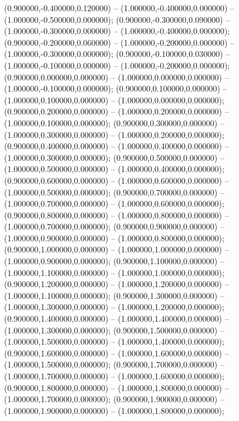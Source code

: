  (0.900000,-0.400000,0.120000) -- (1.000000,-0.400000,0.000000) -- (1.000000,-0.500000,0.000000);
 (0.900000,-0.300000,0.090000) -- (1.000000,-0.300000,0.000000) -- (1.000000,-0.400000,0.000000);
 (0.900000,-0.200000,0.060000) -- (1.000000,-0.200000,0.000000) -- (1.000000,-0.300000,0.000000);
 (0.900000,-0.100000,0.030000) -- (1.000000,-0.100000,0.000000) -- (1.000000,-0.200000,0.000000);
 (0.900000,0.000000,0.000000) -- (1.000000,0.000000,0.000000) -- (1.000000,-0.100000,0.000000);
 (0.900000,0.100000,0.000000) -- (1.000000,0.100000,0.000000) -- (1.000000,0.000000,0.000000);
 (0.900000,0.200000,0.000000) -- (1.000000,0.200000,0.000000) -- (1.000000,0.100000,0.000000);
 (0.900000,0.300000,0.000000) -- (1.000000,0.300000,0.000000) -- (1.000000,0.200000,0.000000);
 (0.900000,0.400000,0.000000) -- (1.000000,0.400000,0.000000) -- (1.000000,0.300000,0.000000);
 (0.900000,0.500000,0.000000) -- (1.000000,0.500000,0.000000) -- (1.000000,0.400000,0.000000);
 (0.900000,0.600000,0.000000) -- (1.000000,0.600000,0.000000) -- (1.000000,0.500000,0.000000);
 (0.900000,0.700000,0.000000) -- (1.000000,0.700000,0.000000) -- (1.000000,0.600000,0.000000);
 (0.900000,0.800000,0.000000) -- (1.000000,0.800000,0.000000) -- (1.000000,0.700000,0.000000);
 (0.900000,0.900000,0.000000) -- (1.000000,0.900000,0.000000) -- (1.000000,0.800000,0.000000);
 (0.900000,1.000000,0.000000) -- (1.000000,1.000000,0.000000) -- (1.000000,0.900000,0.000000);
 (0.900000,1.100000,0.000000) -- (1.000000,1.100000,0.000000) -- (1.000000,1.000000,0.000000);
 (0.900000,1.200000,0.000000) -- (1.000000,1.200000,0.000000) -- (1.000000,1.100000,0.000000);
 (0.900000,1.300000,0.000000) -- (1.000000,1.300000,0.000000) -- (1.000000,1.200000,0.000000);
 (0.900000,1.400000,0.000000) -- (1.000000,1.400000,0.000000) -- (1.000000,1.300000,0.000000);
 (0.900000,1.500000,0.000000) -- (1.000000,1.500000,0.000000) -- (1.000000,1.400000,0.000000);
 (0.900000,1.600000,0.000000) -- (1.000000,1.600000,0.000000) -- (1.000000,1.500000,0.000000);
 (0.900000,1.700000,0.000000) -- (1.000000,1.700000,0.000000) -- (1.000000,1.600000,0.000000);
 (0.900000,1.800000,0.000000) -- (1.000000,1.800000,0.000000) -- (1.000000,1.700000,0.000000);
 (0.900000,1.900000,0.000000) -- (1.000000,1.900000,0.000000) -- (1.000000,1.800000,0.000000);
